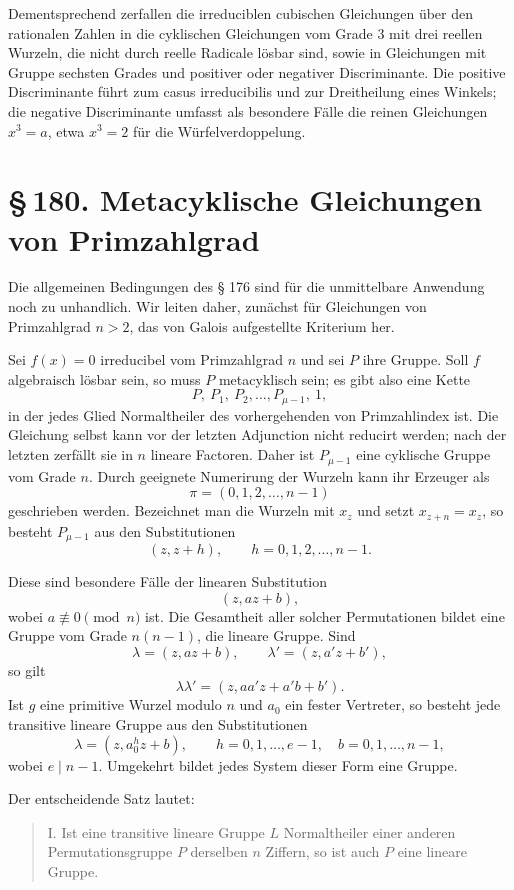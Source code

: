 \documentclass[11pt]{article}
\providecommand{\sect}[2]{\section*{\S\,#1. #2}}
\begin{document}
Dementsprechend zerfallen die irreduciblen cubischen Gleichungen über den rationalen Zahlen in die cyklischen Gleichungen vom Grade $3$ mit drei reellen Wurzeln, die nicht durch reelle Radicale lösbar sind, sowie in Gleichungen mit Gruppe sechsten Grades und positiver oder negativer Discriminante. Die positive Discriminante führt zum casus irreducibilis und zur Dreitheilung eines Winkels; die negative Discriminante umfasst als besondere Fälle die reinen Gleichungen $x^3=a$, etwa $x^3=2$ für die Würfelverdoppelung.

\sect{180}{Metacyklische Gleichungen von Primzahlgrad}

Die allgemeinen Bedingungen des § 176 sind für die unmittelbare Anwendung noch zu unhandlich. Wir leiten daher, zunächst für Gleichungen von Primzahlgrad $n>2$, das von Galois aufgestellte Kriterium her.

Sei $f(x)=0$ irreducibel vom Primzahlgrad $n$ und sei $P$ ihre Gruppe. Soll $f$ algebraisch lösbar sein, so muss $P$ metacyklisch sein; es gibt also eine Kette
\[
  P,\ P_1,\ P_2,\ldots, P_{\mu-1},\ 1,                         \tag{1}
\]
in der jedes Glied Normaltheiler des vorhergehenden von Primzahlindex ist. Die Gleichung selbst kann vor der letzten Adjunction nicht reducirt werden; nach der letzten zerfällt sie in $n$ lineare Factoren. Daher ist $P_{\mu-1}$ eine cyklische Gruppe vom Grade $n$. Durch geeignete Numerirung der Wurzeln kann ihr Erzeuger als
\[
  \pi=(0,1,2,\ldots,n-1)
\]
geschrieben werden. Bezeichnet man die Wurzeln mit $x_z$ und setzt $x_{z+n}=x_z$, so besteht $P_{\mu-1}$ aus den Substitutionen
\[
  (z,z+h),\qquad h=0,1,2,\ldots,n-1.                            \tag{2}
\]

Diese sind besondere Fälle der linearen Substitution
\[
  (z,az+b),                                                     \tag{3}
\]
wobei $a\not\equiv0\pmod n$ ist. Die Gesamtheit aller solcher Permutationen bildet eine Gruppe vom Grade $n(n-1)$, die lineare Gruppe. Sind
\[
  \lambda=(z,az+b),\qquad \lambda'=(z,a'z+b'),
\]
so gilt
\[
  \lambda\lambda'=(z,aa'z+a'b+b').                              \tag{4}
\]
Ist $g$ eine primitive Wurzel modulo $n$ und $a_0$ ein fester Vertreter, so besteht jede transitive lineare Gruppe aus den Substitutionen
\[
  \lambda=(z,a_0^h z+b),\qquad h=0,1,\ldots,e-1,
  \quad b=0,1,\ldots,n-1,                                      \tag{5}
\]
wobei $e\mid n-1$. Umgekehrt bildet jedes System dieser Form eine Gruppe.

Der entscheidende Satz lautet:
\begin{quote}
I. Ist eine transitive lineare Gruppe $L$ Normaltheiler einer anderen Permutationsgruppe $P$ derselben $n$ Ziffern, so ist auch $P$ eine lineare Gruppe.
\end{quote}
\end{document}
